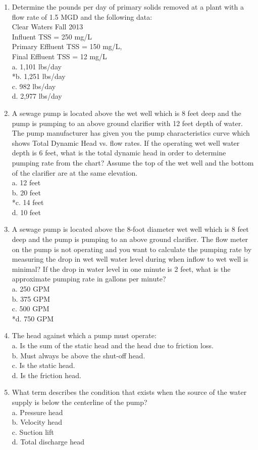 \begin{enumerate}
\item Determine the pounds per day of primary solids removed at a plant with a flow rate of 1.5 MGD and the following data:\\
Clear Waters Fall 2013\\
Influent TSS = 250 mg/L\\
Primary Effluent TSS = 150 mg/L,\\
Final Effluent TSS = 12 mg/L\\
a. 1,101 lbs/day\\
*b. 1,251 lbs/day\\
c. 982 lbs/day\\
d. 2,977 lbs/day\\

\item A sewage pump is located above the wet well which is 8 feet deep and the
pump is pumping to an above ground clarifier with 12 feet depth of water.
The pump manufacturer has given you the pump characteristics curve
which shows Total Dynamic Head vs. flow rates. If the operating wet well
water depth is 6 feet, what is the total dynamic head in order to determine
pumping rate from the chart? Assume the top of the wet well and the
bottom of the clarifier are at the same elevation.\\
a. 12 feet\\
b. 20 feet\\
*c. 14 feet\\
d. 10 feet\\

\item A sewage pump is located above the 8-foot diameter wet well which is
8 feet deep and the pump is pumping to an above ground clarifier. The flow
meter on the pump is not operating and you want to calculate the pumping
rate by measuring the drop in wet well water level during when inflow to
wet well is minimal? If the drop in water level in one minute is 2 feet, what
is the approximate pumping rate in gallons per minute?\\
a. 250 GPM\\
b. 375 GPM\\
c. 500 GPM\\
*d. 750 GPM\\

\item The head against which a pump must operate:\\
a. Is the sum of the static head and the head due to friction loss.\\
b. Must always be above the shut-off head.\\
c. Is the static head.\\
d. Is the friction head.\\
\item What term describes the condition that exists when the source of the water supply is below the centerline of the pump?\\
a. Pressure head\\
b. Velocity head\\
c. Suction lift\\
d. Total discharge head\\


\end{enumerate}
